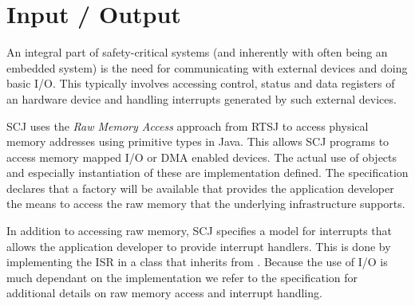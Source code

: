 \section{Input / Output}
\label{section:inputOutput}
An integral part of safety-critical systems (and inherently with often being an embedded system) is the need for communicating with external devices and doing basic I/O. This typically involves accessing control, status and data registers of an hardware device and handling interrupts generated by such external devices.

SCJ uses the \textit{Raw Memory Access} approach from RTSJ to access physical memory addresses using primitive types in Java. This allows SCJ programs to access memory mapped I/O or DMA enabled devices. The actual use of  objects and especially instantiation of these are implementation defined. The specification declares that a factory will be available that provides the application developer the means to access the raw memory that the underlying infrastructure supports.

In addition to accessing raw memory, SCJ specifies a model for interrupts that allows the application developer to provide interrupt handlers. This is done by implementing the ISR in a class that inherits from . Because the use of I/O is much dependant on the implementation we refer to the specification for additional details on raw memory access and interrupt handling.
